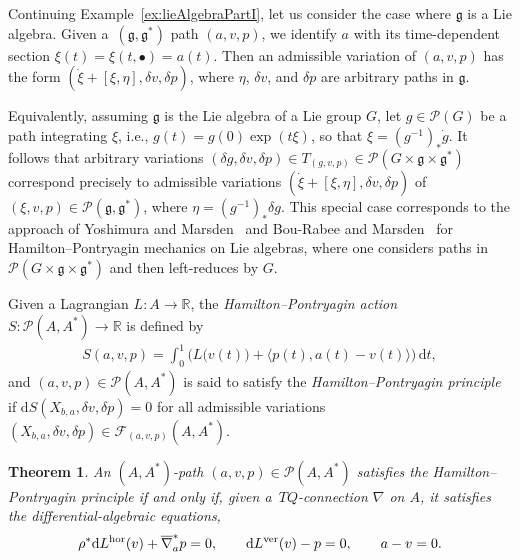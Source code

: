 \documentclass[pdftex]{sigma}
\numberwithin{equation}{section}
\newtheorem{Theorem}{Theorem}[section]
\begin{document}
\begin{Example} Continuing Example~\ref{ex:lieAlgebraPartI}, let us consider the case where $ \mathfrak{g} $ is a Lie algebra. Given a~$ ( \mathfrak{g} , \mathfrak{g} ^\ast ) $ path $ ( a, v, p ) $, we identify $a$ with its time-dependent section $ \xi (t) = \xi ( t, \bullet ) = a (t) $. Then an admissible
 variation of $ ( a, v, p ) $ has the form $ ( \dot{ \xi } + [ \xi, \eta ] , \delta v , \delta p ) $, where $ \eta $, $ \delta v $, and $ \delta p $ are arbitrary paths in $ \mathfrak{g} $.

Equivalently, assuming $\mathfrak{g}$ is the Lie algebra of a Lie group $G$, let $ g \in \mathcal{P} (G) $ be a path integrating $\xi$, i.e., $ g (t) = g (0) \exp( t \xi ) $, so that $ \xi = ( g ^{-1} ) _\ast \dot{g} $. It follows that arbitrary variations $ ( \delta g , \delta v, \delta p ) \in T _{ (g,v,p) } \in \mathcal{P} ( G \times \mathfrak{g} \times \mathfrak{g} ^\ast ) $ correspond precisely to admissible variations $ ( \dot{ \xi } + [ \xi, \eta ] , \delta v , \delta p ) $ of $ ( \xi, v, p ) \in \mathcal{P} ( \mathfrak{g} , \mathfrak{g} ^\ast ) $, where $ \eta = ( g ^{-1} ) _\ast \delta g $. This special case corresponds to the approach of Yoshimura and Marsden~\cite{YoMa2007} and Bou-Rabee and Marsden~\cite{BoMa2009} for Hamilton--Pontryagin mechanics on Lie algebras, where one considers paths in $ \mathcal{P} ( G \times \mathfrak{g} \times \mathfrak{g} ^\ast ) $ and then left-reduces by $G$.
\end{Example}

\begin{Definition}
Given a Lagrangian $ L \colon A \rightarrow \mathbb{R} $, the \emph{Hamilton--Pontryagin action} $ S \colon \mathcal{P} ( A , A ^\ast ) \rightarrow \mathbb{R} $ is def\/ined by
 \begin{gather*}
 S ( a, v , p ) = \int _0 ^1 \bigl( L \bigl( v (t) \bigr) + \bigl\langle p (t) , a (t) - v (t) \bigr\rangle \bigr) \,\mathrm{d}t ,
 \end{gather*}
and $ (a,v,p) \in \mathcal{P} ( A , A ^\ast ) $ is said to satisfy the \emph{Hamilton--Pontryagin principle} if $ \mathrm{d} S ( X _{ b, a } , \delta v , \delta p ) = 0 $ for all admissible variations $ ( X _{ b, a }, \delta v , \delta p ) \in \mathcal{F} _{ (a,v,p) } ( A, A ^\ast ) $.
\end{Definition}

\begin{Theorem}An $ ( A, A ^\ast ) $-path $ ( a, v , p ) \in \mathcal{P} ( A, A ^\ast ) $ satisfies the Hamilton--Pontryagin principle if and only if, given a~$ T Q $-connection $ \nabla $ on $A$, it satisfies the differential-algebraic equations,
 \begin{gather} \label{eqn:implicitELP}
 \rho ^\ast \mathrm{d} L ^\textup{hor} (v) + \overline{ \nabla } _a ^\ast p = 0 , \qquad \mathrm{d} L ^\textup{ver} (v) - p = 0 , \qquad a - v = 0 .
 \end{gather}
\end{Theorem}
\end{document}
